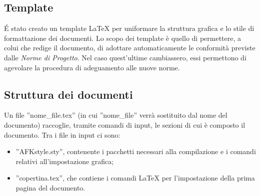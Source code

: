 \subsection{Template}
\'E stato creato un template \LaTeX{} per uniformare la struttura grafica e lo stile di formattazione dei documenti. Lo scopo dei template è quello di permettere, a colui che redige il documento, di adottare automaticamente le conformità previste dalle \textit{Norme di Progetto}. Nel caso quest'ultime cambiassero, essi permettono di agevolare la procedura di adeguamento alle nuove norme.

\subsection{Struttura dei documenti}
Un file ''nome\_file.tex'' (in cui ''nome\_file'' verrà sostituito dal nome del documento) raccoglie, tramite comandi di input, le sezioni di cui è composto il documento. Tra i file in input ci sono:
\begin{itemize}
\item ''AFKstyle.sty'', contenente i pacchetti necessari alla compilazione e i comandi relativi all'impostazione grafica;
\item ''copertina.tex'', che contiene i comandi \LaTeX{} per l'impostazione della prima pagina del documento.
\end{itemize}

